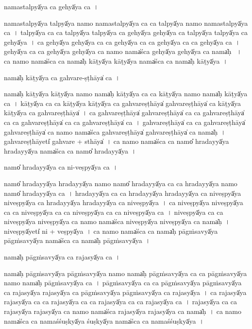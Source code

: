 \documentclass[parskip, DIV=14]{scrartcl}
\begin{document}
{nama॒stalpyā̍ya ca॒ gehyā̍ya ca॒~।

nama॒stalpyā̍ya॒ talpyā̍ya॒ namo॒ nama॒stalpyā̍ya ca ca॒ talpyā̍ya॒ namo॒ nama॒stalpyā̍ya ca~।
talpyā̍ya ca ca॒ talpyā̍ya॒ talpyā̍ya ca॒ gehyā̍ya॒ gehyā̍ya ca॒ talpyā̍ya॒ talpyā̍ya ca॒ gehyā̍ya~।
ca॒ gehyā̍ya॒ gehyā̍ya ca ca॒ gehyā̍ya ca ca॒ gehyā̍ya ca ca॒ gehyā̍ya ca~।
gehyā̍ya ca ca॒ gehyā̍ya॒ gehyā̍ya ca॒ namo॒ nama̍śca॒ gehyā̍ya॒ gehyā̍ya ca॒ nama̍ḥ ~।
ca॒ namo॒ nama̍śca ca॒ nama̍ḥ kā॒ṭyā̍ya kā॒ṭyā̍ya॒ nama̍śca ca॒ nama̍ḥ kā॒ṭyā̍ya~।

nama̍ḥ kā॒ṭyā̍ya ca gahvare॒-ṣṭhāya̍ ca॒~।

nama̍ḥ kā॒ṭyā̍ya kā॒ṭyā̍ya॒ namo॒ nama̍ḥ kā॒ṭyā̍ya ca ca kā॒ṭyā̍ya॒ namo॒ nama̍ḥ kā॒ṭyā̍ya ca~।
kā॒ṭyā̍ya ca ca kā॒ṭyā̍ya kā॒ṭyā̍ya ca gahvare॒ṣṭhāya̍ gahvare॒ṣṭhāya̍ ca kā॒ṭyā̍ya kā॒ṭyā̍ya ca gahvare॒ṣṭhāya̍~।
ca॒ ga॒hva॒re॒ṣṭhāya̍ gahvare॒ṣṭhāya̍  ca ca gahvare॒ṣṭhāya̍ ca ca gahvare॒ṣṭhāya̍  ca ca gahvare॒ṣṭhāya̍ ca~।                                                                               
ga॒hva॒re॒ṣṭhāya̍ ca ca gahvare॒ṣṭhāya̍ gahvare॒ṣṭhāya̍ ca॒ namo॒ nama̍śca gahvare॒ṣṭhāya̍ gahvare॒ṣṭhāya̍ ca॒ nama̍ḥ~। 
ga॒hva॒re॒ṣṭhāyeti̍ gahvare + sthāya̍~।
ca॒ namo॒ nama̍śca ca॒ namo̎ hrada॒yyā̍ya hrada॒yyā̍ya॒ nama̍śca ca॒ namo̎ hrada॒yyā̍ya~।

namo̎ hrada॒yyā̍ya ca ni-ve॒ṣpyā̍ya ca॒~।

namo̎ hrada॒yyā̍ya hrada॒yyā̍ya॒ namo॒ namo̎ hrada॒yyā̍ya ca ca hrada॒yyā̍ya॒ namo॒ namo̎ hrada॒yyā̍ya ca~।
hra॒da॒yyā̍ya ca ca hrada॒yyā̍ya hrada॒yyā̍ya ca nive॒ṣpyā̍ya nive॒ṣpyā̍ya ca hrada॒yyā̍ya hrada॒yyā̍ya ca nive॒ṣpyā̍ya~।
ca॒ ni॒ve॒ṣpyā̍ya nive॒ṣpyā̍ya ca ca nive॒ṣpyā̍ya ca ca nive॒ṣpyā̍ya ca ca nive॒ṣpyā̍ya ca~।
ni॒ve॒ṣpyā̍ya ca ca nive॒ṣpyā̍ya nive॒ṣpyā̍ya ca॒ namo॒ nama̍śca nive॒ṣpyā̍ya nive॒ṣpyā̍ya ca॒ nama̍ḥ~।
ni॒ve॒ṣpyā̍yeti̍ ni + ve॒ṣpyā̍ya~।
ca॒ namo॒ nama̍śca ca॒ nama̍ḥ pāgṁsa॒vyā̍ya pāgṁsa॒vyā̍ya॒ nama̍śca ca॒ nama̍ḥ pāgṁsa॒vyā̍ya~।

nama̍ḥ pāgṁsa॒vyā̍ya ca raja॒syā̍ya ca~।

nama̍ḥ pāgṁsa॒vyā̍ya pāgṁsa॒vyā̍ya॒ namo॒ nama̍ḥ pāgṁsa॒vyā̍ya ca ca pāgṁsa॒vyā̍ya॒ namo॒ nama̍ḥ pāgṁsa॒vyā̍ya ca~।
pā॒gṁ॒sa॒vyā̍ya ca ca pāgṁsa॒vyā̍ya pāgṁsa॒vyā̍ya ca raja॒syā̍ya raja॒syā̍ya ca pāgṁsa॒vyā̍ya pāgṁsa॒vyā̍ya ca raja॒syā̍ya~।
ca॒ ra॒ja॒syā̍ya raja॒syā̍ya ca ca raja॒syā̍ya ca ca raja॒syā̍ya ca ca raja॒syā̍ya ca~।
ra॒ja॒syā̍ya ca ca raja॒syā̍ya raja॒syā̍ya ca॒ namo॒ nama̍śca raja॒syā̍ya raja॒syā̍ya ca॒ nama̍ḥ~।
ca॒ namo॒ nama̍śca ca॒ nama॒śśuṣkyā̍ya॒ śuṣkyā̍ya॒ nama̍śca ca॒ nama॒śśuṣkyā̍ya~।

}
\end{document}
